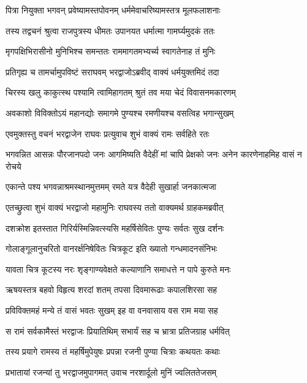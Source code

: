 \twolineshloka
{पित्रा नियुक्ता भगवन् प्रवेष्यामस्तपोवनम्}
{धर्ममेवाचरिष्यामस्तत्र मूलफलाशनाः} %

\twolineshloka
{तस्य तद्वचनं श्रुत्वा राजपुत्रस्य धीमतः}
{उपानयत धर्मात्मा गामर्घ्यमुदकं ततः} %

\twolineshloka
{मृगपक्षिभिरासीनो मुनिभिश्च समन्ततः}
{राममागतमभ्यर्च्य स्वागतेनाह तं मुनिः} %

\twolineshloka
{प्रतिगृह्य च तामर्चामुपविष्टं सराघवम्}
{भरद्वाजोऽब्रवीद् वाक्यं धर्मयुक्तमिदं तदा} %

\twolineshloka
{चिरस्य खलु काकुत्स्थ पश्यामि त्वामिहागतम्}
{श्रुतं तव मया चेदं विवासनमकारणम्} %

\twolineshloka
{अवकाशो विविक्तोऽयं महानद्योः समागमे}
{पुण्यश्च रमणीयश्च वसत्विह भगान्सुखम्} %

\twolineshloka
{एवमुक्तस्तु वचनं भरद्वाजेन राघवः}
{प्रत्युवाच शुभं वाक्यं रामः सर्वहिते रतः} %

\threelineshloka
{भगवन्नित आसन्नः पौरजानपदो जनः}
{आगमिष्यति वैदेहीं मां चापि प्रेक्षको जनः}
{अनेन कारणेनाहमिह वासं न रोचये} %

\twolineshloka
{एकान्ते पश्य भगवन्नाश्रमस्थानमुत्तमम्}
{रमते यत्र वैदेही सुखार्हा जनकात्मजा} %

\twolineshloka
{एतच्छ्रुत्वा शुभं वाक्यं भरद्वाजो महामुनिः}
{राघवस्य ततो वाक्यमर्थ ग्राहकमब्रवीत्} %

\twolineshloka
{दशक्रोश इतस्तात गिरिर्यस्मिन्निवत्स्यसि}
{महर्षिसेवितः पुण्यः सर्वतः सुख दर्शनः} %

\twolineshloka
{गोलाङ्गूलानुचरितो वानरर्क्षनिषेवितः}
{चित्रकूट इति ख्यातो गन्धमादनसंनिभः} %

\twolineshloka
{यावता चित्र कूटस्य नरः शृङ्गाण्यवेक्षते}
{कल्याणानि समाधत्ते न पापे कुरुते मनः} %

\twolineshloka
{ऋषयस्तत्र बहवो विहृत्य शरदां शतम्}
{तपसा दिवमारूढाः कपालशिरसा सह} %

\twolineshloka
{प्रविविक्तमहं मन्ये तं वासं भवतः सुखम्}
{इह वा वनवासाय वस राम मया सह} %

\twolineshloka
{स रामं सर्वकामैस्तं भरद्वाजः प्रियातिथिम्}
{सभार्यं सह च भ्रात्रा प्रतिजग्राह धर्मवित्} %

\twolineshloka
{तस्य प्रयागे रामस्य तं महर्षिमुपेयुषः}
{प्रपन्ना रजनी पुण्या चित्राः कथयतः कथाः} %

\twolineshloka
{प्रभातायां रजन्यां तु भरद्वाजमुपागमत्}
{उवाच नरशार्दूलो मुनिं ज्वलिततेजसम्} %

